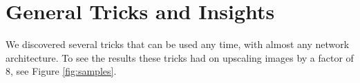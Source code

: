 \documentclass[10pt,twocolumn,letterpaper]{article}
\begin{document}

\section{General Tricks and Insights}
We discovered several tricks that can be used any time, with almost any network architecture. To see the results these tricks had on upscaling images by a factor of $8$, see Figure \ref{fig:samples}.
\end{document}

